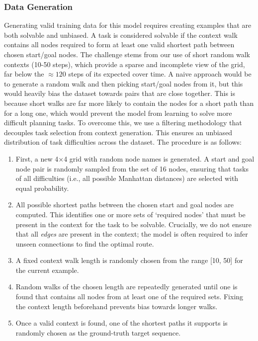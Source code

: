 \subsubsection*{Data Generation}
Generating valid training data for this model requires creating examples that are both solvable and unbiased. A task is considered solvable if the context walk contains all nodes required to form at least one valid shortest path between chosen start/goal nodes. The challenge stems from our use of short random walk contexts (10-50 steps), which provide a sparse and incomplete view of the grid, far below the $\approx120$ steps of its expected cover time. A naive approach would be to generate a random walk and then picking start/goal nodes from it, but this would heavily bias the dataset towards pairs that are close together. This is because short walks are far more likely to contain the nodes for a short path than for a long one, which would prevent the model from learning to solve more difficult planning tasks. To overcome this, we use a filtering methodology that decouples task selection from context generation. This ensures an unbiased distribution of task difficulties across the dataset. The procedure is as follows:

\begin{enumerate}
\item First, a new 4×4 grid with random node names is generated. A start and goal node pair is randomly sampled from the set of 16 nodes, ensuring that tasks of all difficulties (i.e., all possible Manhattan distances) are selected with equal probability.
\item All possible shortest paths between the chosen start and goal nodes are computed. This identifies one or more sets of `required nodes' that must be present in the context for the task to be solvable. Crucially, we do not ensure that all \textit{edges} are present in the context; the model is often required to infer unseen connections to find the optimal route.
\item A fixed context walk length is randomly chosen from the range [10, 50] for the current example. 
\item Random walks of the chosen length are repeatedly generated until one is found that contains all nodes from at least one of the required sets. Fixing the context length beforehand prevents bias towards longer walks.
\item Once a valid context is found, one of the shortest paths it supports is randomly chosen as the ground-truth target sequence.
\end{enumerate}

